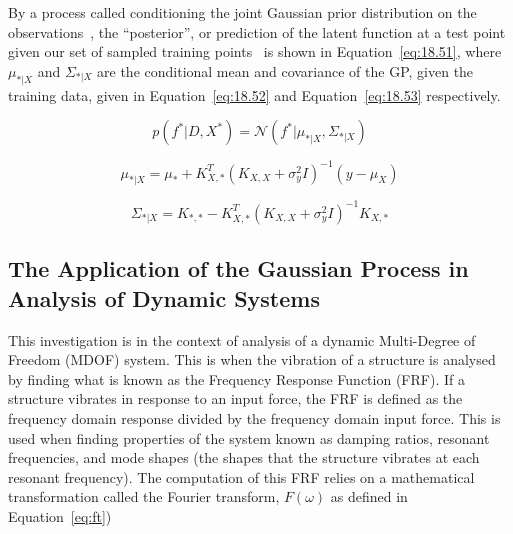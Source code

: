 \documentclass[12pt]{article}
\begin{document}
    By a process called conditioning the joint Gaussian prior distribution on the observations~\cite{rasmussen2006gaussian}, the ``posterior'', or prediction of the latent function at a test point given our set of sampled training points~\cite{murphy2023probabilistic} is shown in Equation~\ref{eq:18.51}, where $\mu_{*|X}$ and $\Sigma_{*|X}$ are the conditional mean and covariance of the GP, given the training data, given in Equation~\ref{eq:18.52} and Equation~\ref{eq:18.53} respectively.

    \begin{equation}
        p(f^* | D, X^*) = \mathcal{N}(f^* | \mu_{*|X}, \Sigma_{*|X})\label{eq:18.51}
    \end{equation}

    \begin{equation}
        \mu_{*|X} = \mu_* + K_{X,*}^T (K_{X,X} + \sigma^2_y I)^{-1} (y - \mu_X)\label{eq:18.52}
    \end{equation}

    \begin{equation}
        \Sigma_{*|X} = K_{*,*} - K_{X,*}^T (K_{X,X} + \sigma^2_y I)^{-1} K_{X,*}\label{eq:18.53}
    \end{equation}



    \subsection{The Application of the Gaussian Process in Analysis of Dynamic Systems}

    This investigation is in the context of analysis of a dynamic Multi-Degree of Freedom (MDOF) system.
    This is when the vibration of a structure is analysed by finding what is known as the Frequency Response Function (FRF). If a structure vibrates in response to an input force, the FRF is defined as the frequency domain response divided by the frequency domain input force.
    This is used when finding properties of the system known as damping ratios, resonant frequencies, and mode shapes (the shapes that the structure vibrates at each resonant frequency).
    The computation of this FRF relies on a mathematical transformation called the Fourier transform, $F(\omega)$ as defined in Equation~\ref{eq:ft})
\end{document}
